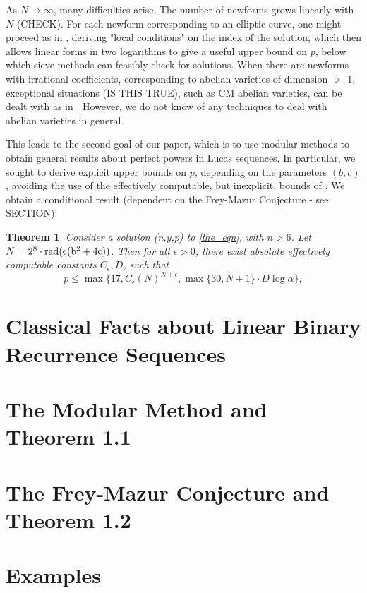 \documentclass[12pt]{amsart}
\newtheorem{thm}{Theorem}[section]
\theoremstyle{definition}
\newcommand{\rad}{\rm rad}
\begin{document}
As $N \to \infty$, many difficulties arise. The number of newforms grows linearly with $N$ (CHECK). For each newform corresponding to an elliptic curve, one might proceed as in \cite{siksek06}, deriving "local conditions" on the index of the solution, which then allows linear forms in two logarithms to give a useful upper bound on $p$, below which sieve methods can feasibly check for solutions. When there are newforms with irrational coefficients, corresponding to abelian varieties of dimension $>$ 1, exceptional situations (IS THIS TRUE), such as CM abelian varieties, can be dealt with as in \cite{bennett04}. However, we do not know of any techniques to deal with abelian varieties in general.

This leads to the second goal of our paper, which is to use modular methods to obtain general results about perfect powers in Lucas sequences. In particular, we sought to derive explicit upper bounds on $p$, depending on the parameters $(b,c)$, avoiding the use of the effectively computable, but inexplicit, bounds of \cite{petho82}\cite{shorey83}. We obtain a conditional result (dependent on the Frey-Mazur Conjecture - see SECTION):

\begin{thm}\label{condbound}
Consider a solution (n,y,p) to \eqref{the_eqn}, with $n > 6$. Let $N = 2^8 \cdot \rad(c(b^2+4c))$. Then for all $\epsilon > 0$, there exist absolute effectively computable constants $C_{\epsilon}, D$, such that
\[ p \leq \max\{17, C_{\epsilon} \left( N \right)^{N + \epsilon}, \max\{30, N+1\} \cdot D\log{\alpha} \}, \]

\end{thm}



\section{Classical Facts about Linear Binary Recurrence Sequences}


\section{The Modular Method and Theorem 1.1}


\section{The Frey-Mazur Conjecture and Theorem 1.2}


\section{Examples}



















{}

\end{document}
